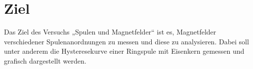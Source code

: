 \section{Ziel}
\label{sec:Ziel}
\setlength{\parindent}{0pt}

Das Ziel des Versuchs „Spulen und Magnetfelder“ ist es, Magnetfelder verschiedener Spulenanordnungen zu messen
und diese zu analysieren. Dabei soll unter anderem die Hysteresekurve einer Ringspule mit Eisenkern gemessen
und grafisch dargestellt werden.